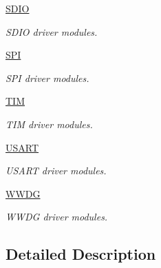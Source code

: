 \begin{DoxyCompactItemize}
\hyperlink{group___s_d_i_o}{S\+D\+IO}
\begin{DoxyCompactList}\small\item\em S\+D\+IO driver modules. \end{DoxyCompactList}\item 
\hyperlink{group___s_p_i}{S\+PI}
\begin{DoxyCompactList}\small\item\em S\+PI driver modules. \end{DoxyCompactList}\item 
\hyperlink{group___t_i_m}{T\+IM}
\begin{DoxyCompactList}\small\item\em T\+IM driver modules. \end{DoxyCompactList}\item 
\hyperlink{group___u_s_a_r_t}{U\+S\+A\+RT}
\begin{DoxyCompactList}\small\item\em U\+S\+A\+RT driver modules. \end{DoxyCompactList}\item 
\hyperlink{group___w_w_d_g}{W\+W\+DG}
\begin{DoxyCompactList}\small\item\em W\+W\+DG driver modules. \end{DoxyCompactList}\end{DoxyCompactItemize}


\subsection{Detailed Description}
